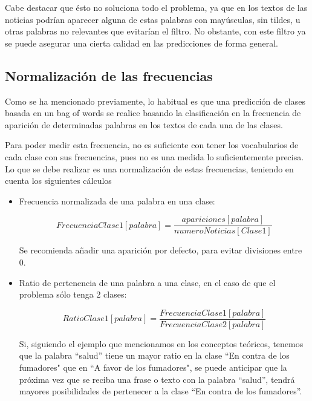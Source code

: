 Cabe destacar que ésto no soluciona todo el problema, ya que en los textos de las noticias podrían aparecer alguna de estas palabras con mayúsculas, sin tildes, u otras palabras no relevantes que evitarían el filtro. No obstante, con este filtro ya se puede asegurar una cierta calidad en las predicciones de forma general.

\subsection{Normalización de las frecuencias}

Como se ha mencionado previamente, lo habitual es que una predicción de clases basada en un bag of words se realice basando la clasificación en la frecuencia de aparición de determinadas palabras en los textos de cada una de las clases.

Para poder medir esta frecuencia, no es suficiente con tener los vocabularios de cada clase con sus frecuencias, pues no es una medida lo suficientemente precisa. Lo que se debe realizar es una normalización de estas frecuencias, teniendo en cuenta los siguientes cálculos \cite{spamtutorial}

\begin{itemize}

\item Frecuencia normalizada de una palabra en una clase:

\[ \mathit{FrecuenciaClase1}[ \mathit{palabra}] = \frac{\mathit{apariciones}[ \mathit{palabra}]}{\mathit{numeroNoticias}[ \mathit{Clase1}]} \]

Se recomienda añadir una aparición por defecto, para evitar divisiones entre 0.

\item Ratio de pertenencia de una palabra a una clase, en el caso de que el problema sólo tenga 2 clases:

\[ \mathit{RatioClase1}[ \mathit{palabra}] = \frac{\mathit{FrecuenciaClase1}[ \mathit{palabra}]}{\mathit{FrecuenciaClase2}[ \mathit{palabra}]} \]

Si, siguiendo el ejemplo que mencionamos en los conceptos teóricos, tenemos que la palabra ``salud'' tiene un mayor ratio en la clase ``En contra de los fumadores" que en ``A favor de los fumadores", se puede anticipar que la próxima vez que se reciba una frase o texto con la palabra ``salud'', tendrá mayores posibilidades de pertenecer a la clase ``En contra de los fumadores''.

\end{itemize}

